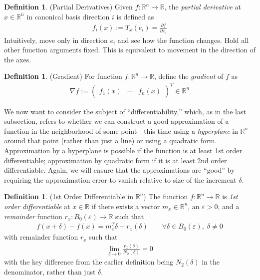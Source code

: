 \documentclass[12pt]{article}
\numberwithin{equation}{section} %
\theoremstyle{plain}
\theoremstyle{definition}
\newtheorem{defn}[thm]{Definition}
\theoremstyle{remark}
\newcommand{\R}{\mathbb{R}}
\newcommand{\Rn}{\mathbb{R}^n}
\begin{document}
\begin{defn}{(Partial Derivatives)}
Given $f:\Rn\rightarrow\R$, the \emph{partial derivative} at $x\in\Rn$
in canonical basis direction $i$ is defined as
\begin{align*}
  f_i(x) := T_x(e_i) = \frac{\partial f}{\partial x_i}
\end{align*}
Intuitively, move only in direction $e_i$ and see how the function
changes. Hold all other function arguments fixed. This is equivalent to
movement in the direction of the axes.
\end{defn}

\begin{defn}{(Gradient)}
For function $f:\Rn\rightarrow\R$, define the \emph{gradient} of $f$ as
\begin{align*}
  \nabla f :=
  \begin{pmatrix}
    f_1(x) & \cdots & f_n(x)
  \end{pmatrix}^T \in \Rn
\end{align*}
\end{defn}

We now want to consider the subject of ``differentiability,'' which, as
in the last subsection, refers to whether we can construct a good
approximation of a function in the neighborhood of some point---this
time using a \emph{hyperplane} in $\Rn$ around that point (rather than
just a line) or using a quadratic form.  Approximation by a hyperplane
is possible if the function is at least 1st order differentiable;
approximation by quadratic form if it is at least 2nd order
differentiable.  Again, we will ensure that the approximations are
``good'' by requiring the approximation error to vanish relative to size
of the increment $\delta$.

\begin{defn}{(1st Order Differentiable in $\Rn$)}
\label{defn:diffableRn}
The function $f:\Rn\rightarrow\R$ is \emph{1st order differentiable} at
$x\in\R$ if there exists a vector $m_x\in\Rn$, an $\varepsilon>0$, and a
\emph{remainder} function $r_x:B_0(\varepsilon)\rightarrow\R$ such that
\begin{align}
  \label{eq:diffapproxRn}
  f(x+\delta)-f(x) = m_x^T \delta + r_x(\delta)
  \qquad \forall \delta\in B_0(\varepsilon), \; \delta \neq 0
\end{align}
with remainder function $r_x$ such that
\begin{align}
  \label{lim:remainderRn}
  \lim_{\delta\rightarrow 0}
  \frac{r_x(\delta)}{N_2(\delta)}=0
\end{align}
with the key difference from the earlier definition being $N_2(\delta)$
in the denominator, rather than just $\delta$.
\end{defn}
\end{document}
